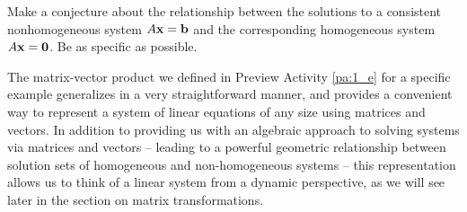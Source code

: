 \begin{pa}
	\item Make a conjecture about the relationship between the solutions to a consistent nonhomogeneous system $A \mathbf{x} = \mathbf{b}$ and the corresponding homogeneous system $A \mathbf{x} = \mathbf{0}$. Be as specific as possible.

	
	\ea

\ee

\end{pa} 




The matrix-vector product we defined in Preview Activity \ref{pa:1_e} for a specific example generalizes in a very straightforward manner, and provides a convenient way to represent a system of linear equations of any size using matrices and vectors. In addition to providing us with an algebraic approach to solving systems via matrices and vectors -- leading to a powerful geometric relationship between solution sets of homogeneous and non-homogeneous systems -- this representation allows us to think of a linear system from a dynamic perspective, as we will see later in the section on matrix transformations. 

